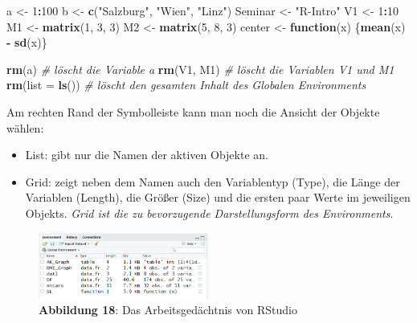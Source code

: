 \documentclass[]{article}
\newenvironment{Shaded}{\begin{snugshade}}{\end{snugshade}}
\newcommand{\KeywordTok}[1]{\textcolor[rgb]{0.13,0.29,0.53}{\textbf{#1}}}
\newcommand{\DataTypeTok}[1]{\textcolor[rgb]{0.13,0.29,0.53}{#1}}
\newcommand{\DecValTok}[1]{\textcolor[rgb]{0.00,0.00,0.81}{#1}}
\newcommand{\StringTok}[1]{\textcolor[rgb]{0.31,0.60,0.02}{#1}}
\newcommand{\CommentTok}[1]{\textcolor[rgb]{0.56,0.35,0.01}{\textit{#1}}}
\newcommand{\ControlFlowTok}[1]{\textcolor[rgb]{0.13,0.29,0.53}{\textbf{#1}}}
\newcommand{\OperatorTok}[1]{\textcolor[rgb]{0.81,0.36,0.00}{\textbf{#1}}}
\newcommand{\NormalTok}[1]{#1}
\providecommand{\tightlist}{%
  \setlength{\itemsep}{0pt}\setlength{\parskip}{0pt}}
\begin{document}
\begin{Shaded}
\begin{Highlighting}[]
\NormalTok{  a       <-}\StringTok{ }\DecValTok{1}\OperatorTok{:}\DecValTok{100}
\NormalTok{  b       <-}\StringTok{ }\KeywordTok{c}\NormalTok{(}\StringTok{"Salzburg"}\NormalTok{, }\StringTok{"Wien"}\NormalTok{, }\StringTok{"Linz"}\NormalTok{)}
\NormalTok{  Seminar <-}\StringTok{ "R-Intro"}
\NormalTok{  V1      <-}\StringTok{ }\DecValTok{1}\OperatorTok{:}\DecValTok{10}
\NormalTok{  M1      <-}\StringTok{ }\KeywordTok{matrix}\NormalTok{(}\DecValTok{1}\NormalTok{, }\DecValTok{3}\NormalTok{, }\DecValTok{3}\NormalTok{)}
\NormalTok{  M2      <-}\StringTok{ }\KeywordTok{matrix}\NormalTok{(}\DecValTok{5}\NormalTok{, }\DecValTok{8}\NormalTok{, }\DecValTok{3}\NormalTok{)}
\NormalTok{  center  <-}\StringTok{ }\ControlFlowTok{function}\NormalTok{(x) \{}\KeywordTok{mean}\NormalTok{(x) }\OperatorTok{-}\StringTok{ }\KeywordTok{sd}\NormalTok{(x)\}}
  
  \KeywordTok{rm}\NormalTok{(a)           }\CommentTok{# löscht die Variable a}
  \KeywordTok{rm}\NormalTok{(V1, M1)      }\CommentTok{# löscht die Variablen V1 und M1}
  \KeywordTok{rm}\NormalTok{(}\DataTypeTok{list =} \KeywordTok{ls}\NormalTok{()) }\CommentTok{# löscht den gesamten Inhalt des Globalen Environments}
\end{Highlighting}
\end{Shaded}

Am rechten Rand der Symbolleiste kann man noch die Ansicht der Objekte
wählen:

\begin{itemize}
\tightlist
\item
  List: gibt nur die Namen der aktiven Objekte an.
\item
  Grid: zeigt neben dem Namen auch den Variablentyp (Type), die Länge
  der Variablen (Length), die Größer (Size) und die ersten paar Werte im
  jeweiligen Objekts. \emph{Grid ist die zu bevorzugende
  Darstellungsform des Environments}.
\end{itemize}

\begin{figure}
\centering
\includegraphics[width=0.50000\textwidth]{Images/04_Environment.PNG}
\caption{\textbf{Abbildung 18}: Das Arbeitsgedächtnis von RStudio}
\end{figure}
\end{document}
